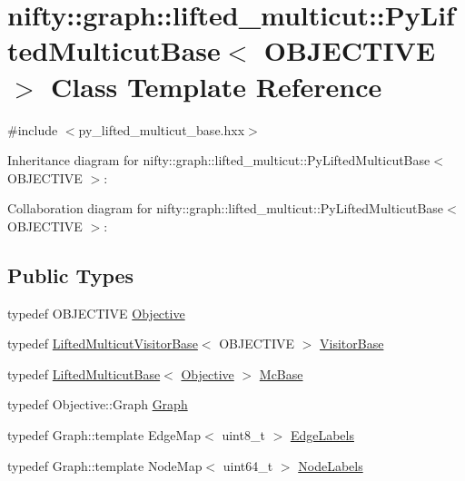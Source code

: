 \hypertarget{classnifty_1_1graph_1_1lifted__multicut_1_1PyLiftedMulticutBase}{}\section{nifty\+:\+:graph\+:\+:lifted\+\_\+multicut\+:\+:Py\+Lifted\+Multicut\+Base$<$ O\+B\+J\+E\+C\+T\+I\+V\+E $>$ Class Template Reference}
\label{classnifty_1_1graph_1_1lifted__multicut_1_1PyLiftedMulticutBase}


{\ttfamily \#include $<$py\+\_\+lifted\+\_\+multicut\+\_\+base.\+hxx$>$}



Inheritance diagram for nifty\+:\+:graph\+:\+:lifted\+\_\+multicut\+:\+:Py\+Lifted\+Multicut\+Base$<$ O\+B\+J\+E\+C\+T\+I\+V\+E $>$\+:


Collaboration diagram for nifty\+:\+:graph\+:\+:lifted\+\_\+multicut\+:\+:Py\+Lifted\+Multicut\+Base$<$ O\+B\+J\+E\+C\+T\+I\+V\+E $>$\+:
\subsection*{Public Types}
\begin{DoxyCompactItemize}
\item 
typedef O\+B\+J\+E\+C\+T\+I\+V\+E \hyperlink{classnifty_1_1graph_1_1lifted__multicut_1_1PyLiftedMulticutBase_a1de54ff09e3f51a6c6bc92148e78ad44}{Objective}
\item 
typedef \hyperlink{namespacenifty_1_1graph_1_1lifted__multicut_a0bb4a638bd7a5b2b2f64a9be0df46775}{Lifted\+Multicut\+Visitor\+Base}$<$ O\+B\+J\+E\+C\+T\+I\+V\+E $>$ \hyperlink{classnifty_1_1graph_1_1lifted__multicut_1_1PyLiftedMulticutBase_a94d88bd4d7bf09e48fe8a89108f35070}{Visitor\+Base}
\item 
typedef \hyperlink{classnifty_1_1graph_1_1lifted__multicut_1_1LiftedMulticutBase}{Lifted\+Multicut\+Base}$<$ \hyperlink{classnifty_1_1graph_1_1lifted__multicut_1_1PyLiftedMulticutBase_a1de54ff09e3f51a6c6bc92148e78ad44}{Objective} $>$ \hyperlink{classnifty_1_1graph_1_1lifted__multicut_1_1PyLiftedMulticutBase_ab9586d4f71682a2af32ef9f3283ce311}{Mc\+Base}
\item 
typedef Objective\+::\+Graph \hyperlink{classnifty_1_1graph_1_1lifted__multicut_1_1PyLiftedMulticutBase_aea9f8f1722ad75065d2638d88a5d5d61}{Graph}
\item 
typedef Graph\+::template Edge\+Map$<$ uint8\+\_\+t $>$ \hyperlink{classnifty_1_1graph_1_1lifted__multicut_1_1PyLiftedMulticutBase_a315b2b14771d976533cedb73a8e8004a}{Edge\+Labels}
\item 
typedef Graph\+::template Node\+Map$<$ uint64\+\_\+t $>$ \hyperlink{classnifty_1_1graph_1_1lifted__multicut_1_1PyLiftedMulticutBase_ad79cf52f6bcbd7cfd9c8675d976b8a85}{Node\+Labels}
\end{DoxyCompactItemize}
